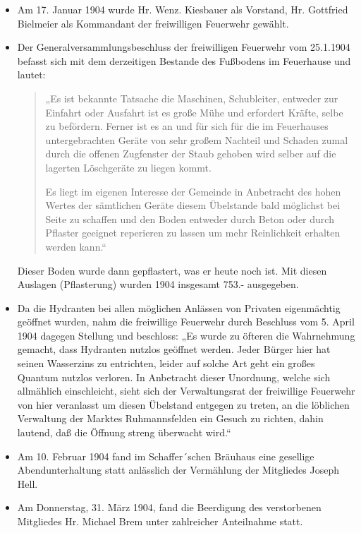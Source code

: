 \documentclass[12pt,a4paper]{book}
\begin{document}
\begin{itemize}
\item Am 17. Januar 1904 wurde Hr. Wenz. Kiesbauer als Vorstand, Hr.
Gottfried Bielmeier als Kommandant der freiwilligen Feuerwehr gewählt.

\item Der Generalversammlungsbeschluss der freiwilligen Feuerwehr vom
25.1.1904 befasst sich mit dem derzeitigen Bestande des Fußbodens im
Feuerhause und lautet:

\begin{quote}
„Es ist bekannte Tatsache die Maschinen, Schubleiter, entweder zur
Einfahrt oder Ausfahrt ist es große Mühe und erfordert Kräfte, selbe zu
befördern. Ferner ist es an und für sich für die im Feuerhauses
untergebrachten Geräte von sehr großem Nachteil und Schaden zumal durch
die offenen Zugfenster der Staub gehoben wird selber auf die lagerten
Löschgeräte zu liegen kommt.

Es liegt im eigenen Interesse der Gemeinde in Anbetracht des hohen
Wertes der sämtlichen Geräte diesem Übelstande bald möglichst bei Seite
zu schaffen und den Boden entweder durch Beton oder durch Pflaster
geeignet reperieren zu lassen um mehr Reinlichkeit erhalten werden
kann.“
\end{quote}

Dieser Boden wurde dann gepflastert, was er heute noch ist. Mit diesen
Auslagen (Pflasterung) wurden 1904 insgesamt 753.- ausgegeben.

\item Da die Hydranten bei allen möglichen Anlässen von Privaten
eigenmächtig geöffnet wurden, nahm die freiwillige Feuerwehr durch
Beschluss vom 5. April 1904 dagegen Stellung und beschloss: „Es wurde zu
öfteren die Wahrnehmung gemacht, dass Hydranten nutzlos geöffnet werden.
Jeder Bürger hier hat seinen Wasserzins zu entrichten, leider auf solche
Art geht ein großes Quantum nutzlos verloren. In Anbetracht dieser
Unordnung, welche sich allmählich einschleicht, sieht sich der
Verwaltungsrat der freiwillige Feuerwehr von hier veranlasst um diesen
Übelstand entgegen zu treten, an die löblichen Verwaltung der Marktes
Ruhmannsfelden ein Gesuch zu richten, dahin lautend, daß die Öffnung
streng überwacht wird.“

\item Am 10. Februar 1904 fand im Schaffer´schen Bräuhaus eine gesellige
Abendunterhaltung statt anlässlich der Vermählung der Mitgliedes Joseph
Hell.

\item Am Donnerstag, 31. März 1904, fand die Beerdigung des verstorbenen
Mitgliedes Hr. Michael Brem unter zahlreicher Anteilnahme statt.


\end{itemize}
\end{document}
